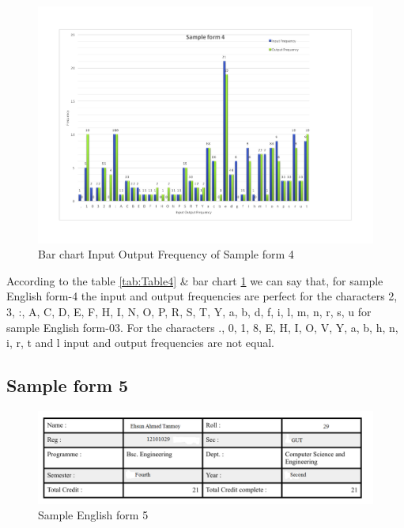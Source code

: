 \begin{figure}[H]
\centering
\includegraphics[width=1\textwidth]{form4.pdf}
\caption {Bar chart Input Output Frequency of Sample form 4}
\label {fig:bar4}
\end{figure}

According to the table \ref{tab:Table4} \& bar chart \ref{fig:bar4} we can say that, for sample English form-4 the input and output frequencies are perfect for the characters 2, 3, :, A, C, D, E, F, H, I, N, O, P, R, S, T, Y, a, b, d, f, i, l, m, n, r, s, u for sample English form-03. For the characters ., 0, 1, 8, E, H, I, O, V, Y, a, b, h, n, i, r, t and l input and output frequencies are not equal. 

\subsection{Sample form 5}

\begin{figure}[H]
\centering
\includegraphics[width=1\textwidth]{form5.png}
\caption {Sample English form 5}
\label {fig:form4}
\end{figure}

